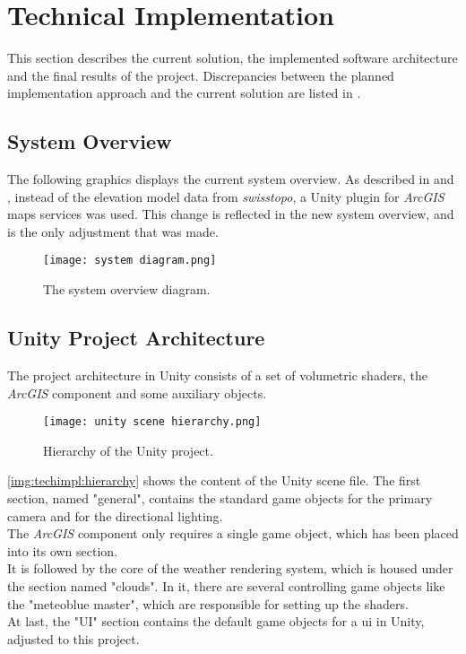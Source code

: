 \section{Technical Implementation}
\label{section:techimpl}
This section describes the current solution, the implemented software architecture and the final results of the project.
Discrepancies between the planned implementation approach and the current solution are listed in .

\subsection{System Overview}
The following graphics displays the current system overview.
As described in  and , instead of the elevation model data from \emph{swisstopo}, a Unity plugin for \emph{ArcGIS} maps services was used.
This change is reflected in the new system overview, and is the only adjustment that was made.

\begin{figure}[H]
    \texttt{[image: system diagram.png]}
    \caption{The system overview diagram.}
    \label{img:techimpl:system}
\end{figure}

\subsection{Unity Project Architecture}
The project architecture in Unity consists of a set of \gls{volumetric} \gls{shader}s, the \emph{ArcGIS} component and some auxiliary objects.
\\
\begin{wrapfigure}[10]{r}{4cm}
    \vspace{-\baselineskip}
    \texttt{[image: unity scene hierarchy.png]}
    \caption{Hierarchy of the Unity project.}
    \label{img:techimpl:hierarchy}
\end{wrapfigure}
\autoref{img:techimpl:hierarchy} shows the content of the Unity scene file.
The first section, named "general", contains the standard game objects for the primary camera and for the directional lighting.
\\
The \emph{ArcGIS} component only requires a single game object, which has been placed into its own section.
\\
It is followed by the core of the weather rendering system, which is housed under the section named "clouds".
In it, there are several controlling game objects like the "meteoblue master", which are responsible for setting up the shaders.
\\
At last, the "UI" section contains the default game objects for a \gls{ui} in Unity, adjusted to this project.

